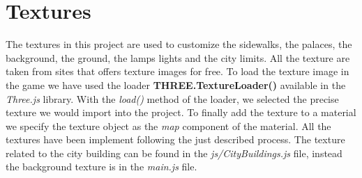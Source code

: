 \documentclass[a4paper, 11pt, titlepage]{report}
\begin{document}
\chapter{Textures}
	The textures in this project are used to customize the sidewalks, the palaces, the background, the ground, the lamps lights and the city limits. All the texture are taken from sites \cite{texturesites} that offers texture images for free. To load the texture image in the game we have used the loader \textbf{THREE.TextureLoader()} available in the \emph{Three.js} library. With the \emph{load()} method of the loader, we selected the precise texture we would import into the project. To finally add the texture to a material we specify the texture object as the \emph{map} component of the material. All the textures have been implement following the just described process. The texture related to the city building can be found in the \emph{js/CityBuildings.js} file, instead the background texture is in the \emph{main.js} file.
 
\end{document}
